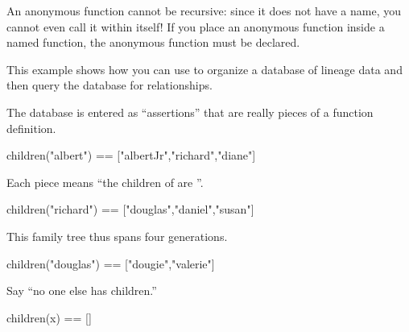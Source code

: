 An anonymous function cannot be recursive: since it does not have a
name, you cannot even call it within itself!
If you place an anonymous function inside a named function, the
anonymous function must be declared.


This example shows how you can use \Language{} to organize a database of
lineage data and then query the database for relationships.

\begin{xtc}
\begin{xtccomment}
The database is entered as ``assertions'' that are really
pieces of a function definition.
\end{xtccomment}
\begin{spadsrc}
children("albert") == ["albertJr","richard","diane"]
\end{spadsrc}
\end{xtc}
\begin{xtc}
\begin{xtccomment}
Each piece
 means
``the children of  are ''.
\end{xtccomment}
\begin{spadsrc}
children("richard") == ["douglas","daniel","susan"]
\end{spadsrc}
\end{xtc}
\begin{xtc}
\begin{xtccomment}
This family tree thus spans four generations.
\end{xtccomment}
\begin{spadsrc}
children("douglas") == ["dougie","valerie"]
\end{spadsrc}
\end{xtc}
\begin{xtc}
\begin{xtccomment}
Say ``no one else has children.''
\end{xtccomment}
\begin{spadsrc}
children(x) == []
\end{spadsrc}
\end{xtc}

